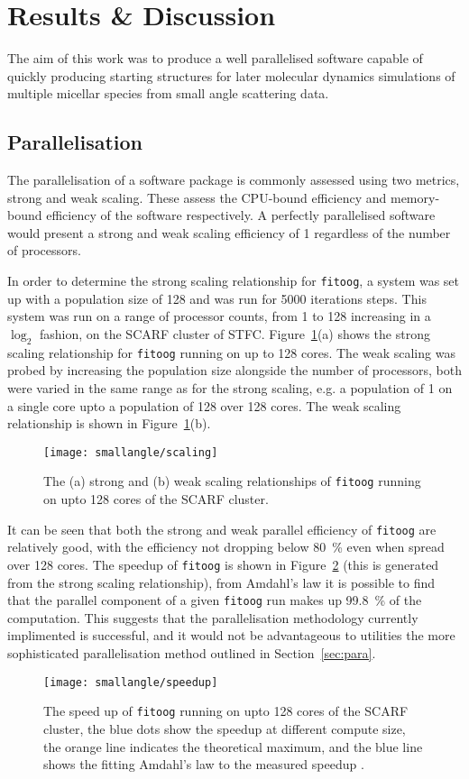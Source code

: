 \section{Results \& Discussion}
The aim of this work was to produce a well parallelised software capable of quickly producing starting structures for later molecular dynamics simulations of multiple micellar species from small angle scattering data.

\subsection{Parallelisation}
The parallelisation of a software package is commonly assessed using two metrics, strong and weak scaling.
These assess the CPU-bound efficiency and memory-bound efficiency of the software respectively.
A perfectly parallelised software would present a strong and weak scaling efficiency of 1 regardless of the number of processors.

In order to determine the strong scaling relationship for \texttt{fitoog}, a system was set up with a population size of 128 and was run for 5000 iterations steps.
This system was run on a range of processor counts, from 1 to 128 increasing in a $\log_2$ fashion, on the SCARF cluster of STFC.
Figure~\ref{fig:scale}(a) shows the strong scaling relationship for \texttt{fitoog} running on up to 128 cores.
The weak scaling was probed by increasing the population size alongside the number of processors, both were varied in the same range as for the strong scaling, e.g. a population of 1 on a single core upto a population of 128 over 128 cores.
The weak scaling relationship is shown in Figure~\ref{fig:scale}(b).
%
\begin{figure}
    \centering
    \texttt{[image: smallangle/scaling]}
    \caption{The (a) strong and (b) weak scaling relationships of \texttt{fitoog} running on upto 128 cores of the SCARF cluster.}
    \label{fig:scale}
\end{figure}
%

It can be seen that both the strong and weak parallel efficiency of \texttt{fitoog} are relatively good, with the efficiency not dropping below \SI{80}{\percent} even when spread over 128 cores.
The speedup of \texttt{fitoog} is shown in Figure~\ref{fig:speedup} (this is generated from the strong scaling relationship), from Amdahl's law \cite{amdahl_validity_1967} it is possible to find that the parallel component of a given \texttt{fitoog} run makes up \SI{99.8}{\percent} of the computation.
This suggests that the parallelisation methodology currently implimented is successful, and it would not be advantageous to utilities the more sophisticated parallelisation method outlined in Section~\ref{sec:para}.
%
\begin{figure}
    \centering
    \texttt{[image: smallangle/speedup]}
    \caption{The speed up of \texttt{fitoog} running on upto 128 cores of the SCARF cluster, the blue dots show the speedup at different compute size, the orange line indicates the theoretical maximum, and the blue line shows the fitting Amdahl's law to the measured speedup \cite{amdahl_validity_1967}.}
    \label{fig:speedup}
\end{figure}
%

